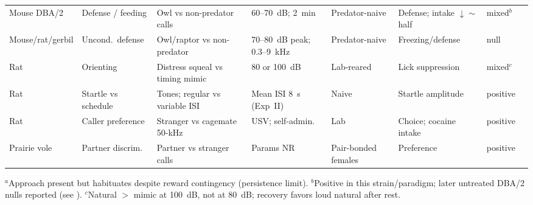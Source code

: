 \begin{landscape}
\begin{longtable}{@{}p{0.85in}p{0.75in}p{1.35in}p{1.1in}p{0.95in}p{0.85in}p{0.55in}p{0.7in}@{}}
Mouse DBA/2 & Defense / feeding & Owl vs non-predator calls & 60--70~dB; 2~min & Predator-naive & Defense; intake $\downarrow\sim$half & mixed$^{b}$ & \citet{HendrieNeill1991} \\ \addlinespace[2pt]
Mouse/rat/gerbil & Uncond.\ defense & Owl/raptor vs non-predator & 70--80~dB peak; 0.3--9~kHz & Predator-naive & Freezing/defense & null & \citet{KindermannEtAl2009} \\ \addlinespace[2pt]
Rat & Orienting & Distress squeal vs timing mimic & 80 or 100~dB & Lab-reared & Lick suppression & mixed$^{c}$ & \citet{EvansHammond1983a} \\ \addlinespace[2pt]
Rat & Startle vs schedule & Tones; regular vs variable ISI & Mean ISI 8~s (Exp~II) & Naive & Startle amplitude & positive & \citet{Davis1970} \\ \addlinespace[2pt]
Rat & Caller preference & Stranger vs cagemate 50-kHz & USV; self-admin.\ & Lab & Choice; cocaine intake & positive & \citet{VielleEtAl2021} \\ \addlinespace[2pt]
Prairie vole & Partner discrim.\ & Partner vs stranger calls & Params NR & Pair-bonded females & Preference & positive & \citet{WarrenEtAl2025} \\
\end{longtable}
\endgroup
{\footnotesize $^{a}$Approach present but habituates despite reward contingency (persistence limit). $^{b}$Positive in this strain/paradigm; later untreated DBA/2 nulls reported (see \citealp{KindermannEtAl2009}). $^{c}$Natural $>$ mimic at 100~dB, not at 80~dB; recovery favors loud natural after rest.}
\end{landscape}

